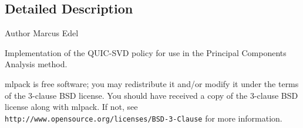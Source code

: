 \subsection{Detailed Description}
\begin{DoxyAuthor}{Author}
Marcus Edel
\end{DoxyAuthor}
Implementation of the Q\+U\+I\+C-\/\+S\+VD policy for use in the Principal Components Analysis method.

mlpack is free software; you may redistribute it and/or modify it under the terms of the 3-\/clause B\+SD license. You should have received a copy of the 3-\/clause B\+SD license along with mlpack. If not, see {\tt http\+://www.\+opensource.\+org/licenses/\+B\+S\+D-\/3-\/\+Clause} for more information. 